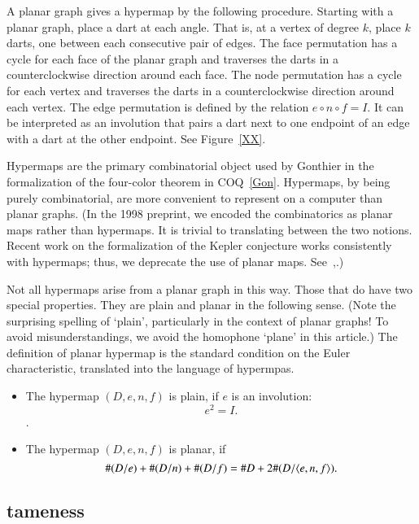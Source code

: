 A planar graph gives  a hypermap
by the following procedure.  Starting with a planar graph,
place a dart at each angle.  That is, at a vertex of degree $k$,
place $k$ darts, one between each consecutive pair of edges.
The face permutation has a cycle for
each face of the planar graph and  traverses the
darts in a counterclockwise direction around each face.
The node permutation has a cycle for each vertex and traverses
the darts in a counterclockwise direction around each vertex.
The edge permutation is defined by the relation $e\circ n\circ f=I$.
It can be interpreted as an involution that pairs a dart next
to one endpoint of an edge with a dart at the other endpoint.
See Figure~\ref{XX}.

Hypermaps are the primary combinatorial object used by Gonthier
in the formalization of the four-color theorem in COQ~\ref{Gon}.
Hypermaps, by being purely combinatorial, are more convenient
to represent on a computer than planar graphs.  (In the 1998
preprint, we encoded the combinatorics as planar maps rather
than hypermaps.  It is trivial to translating between the two notions.
Recent work on the formalization of the Kepler conjecture works
consistently with hypermaps; thus, we deprecate the use of
planar maps.  See~\cite{XXObua},\cite{XXBlue}.)

Not all hypermaps arise from a planar graph in this way.
Those that do have two special properties.  They are plain
and planar in the following sense.  (Note the surprising spelling
of `plain', particularly in the context of planar graphs!  
To avoid misunderstandings, 
we avoid the homophone `plane' in this article.)  The definition
of planar hypermap is the standard condition on the Euler
characteristic, translated into the language of hypermpas.

\begin{definition}\label{def:plain}

\begin{itemize}
\item The hypermap $(D,e,n,f)$ is plain, if $e$ is an involution:
$$
 e^2 = I.
$$.
\item The hypermap $(D,e,n,f)$ is planar, if
   $$
   \#(D/e) + \#(D/n) + \#(D/f) = \# D + 2\#(D/\langle e,n,f\rangle).
   $$
\end{itemize}
\end{definition}

\subsection{tameness}

